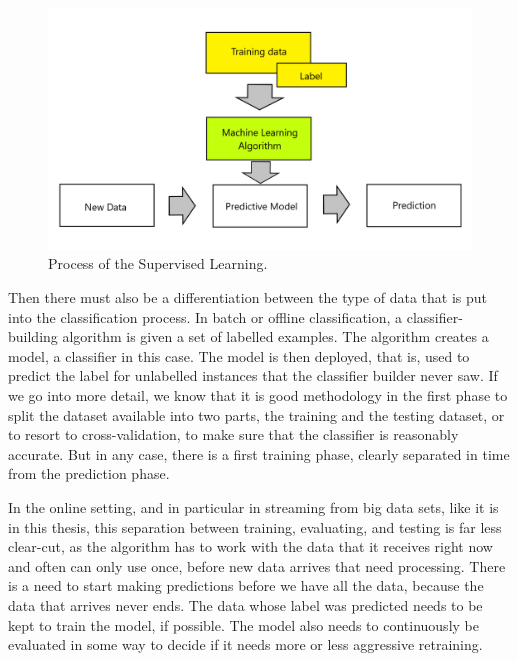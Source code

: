 \documentclass[12pt,oneside,a4paper,parskip]{scrbook}
\begin{document}
\pagebreak

\begin{figure}[H]
  \includegraphics[width=\linewidth]{SL_process_figure}
  \caption{Process of the Supervised Learning. \cite{PythonML}}
  \label{fig:sl_process}
\end{figure}

Then there must also be a differentiation between the type of data that is put into the classification process.
In batch or offline classification, a classifier-building algorithm is given a set of labelled examples. 
The algorithm creates a model, a classifier in this case. The model is then deployed, that is, used to predict the label 
for unlabelled instances that the classifier builder never saw. If we go into more detail, we know that it is good 
methodology in the first phase to split the dataset available into two parts, the training and the testing dataset, 
or to resort to cross-validation, to make sure that the classifier is reasonably accurate.
But in any case, there is a first training phase, clearly separated in time from the prediction phase.

In the online setting, and in particular in streaming from big data sets, like it is in this thesis, this separation between training, 
evaluating, and testing is far less clear-cut, as the algorithm has to work with the data that it receives right now and often can only use once,
before new data arrives that need processing.
There is a need to start making predictions before we have all the data, because the data that arrives never ends. 
The data whose label was predicted needs to be kept to train the model, if possible.
The model also needs to continuously be evaluated in some way to decide if it needs more or 
less aggressive retraining. \cite{MLonDataStreams}
\end{document}
